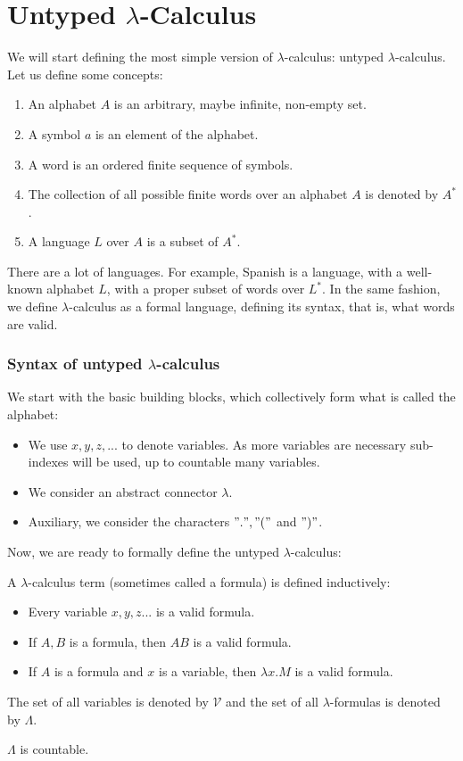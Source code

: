 \section{Untyped $\lambda$-Calculus } \label{lambda-calc-untyped-section}
We will start defining the most simple version of $\lambda$-calculus: untyped $\lambda$-calculus. Let us define some concepts:


\begin{enumerate}
\item An alphabet $A$ is an arbitrary, maybe infinite, non-empty set.
\item A symbol $a$ is an element of the alphabet.
\item A word is an ordered finite sequence of symbols.
\item The collection of all possible finite words over an alphabet $A$ is denoted by $A^*$.
\item A language $L$ over $A$  is a subset of $A^*.$
\end{enumerate}

There are a lot of languages. For example, Spanish is a language, with a well-known alphabet $L$, with a proper subset of words over $L^*$. In the same fashion, we define $\lambda$-calculus as a formal language, defining its syntax, that is, what words are valid.


\subsubsection{Syntax of untyped $\lambda$-calculus}
We start with the basic building blocks, which collectively form what is
called the alphabet:

\begin{itemize}
\item We use $x, y, z,...$ to denote variables. As more variables are necessary sub-indexes will be used, up to countable many variables.
\item We consider an abstract connector $\lambda$.
\item Auxiliary, we consider the characters $".", "("$ and $")"$.
\end{itemize}
Now, we are ready to formally define the untyped $\lambda$-calculus:

\begin{definition}\label{def:untyped-lambda-calc}
  A $\lambda$-calculus term (sometimes called a formula) is defined inductively:
  \begin{itemize}
  \item Every variable $x,y,z...$ is a valid formula.
  \item If $A,B$ is a formula, then $AB$ is a valid formula.
  \item If $A$ is a formula and $x$ is a variable, then $\lambda x.M$ is a valid formula.
  \end{itemize}
  The set of all variables is denoted by $\mathcal{V}$ and the set of all $\lambda$-formulas is denoted by $\Lambda$.
\end{definition}
\begin{remark}
  $\Lambda$ is countable.
\end{remark}

